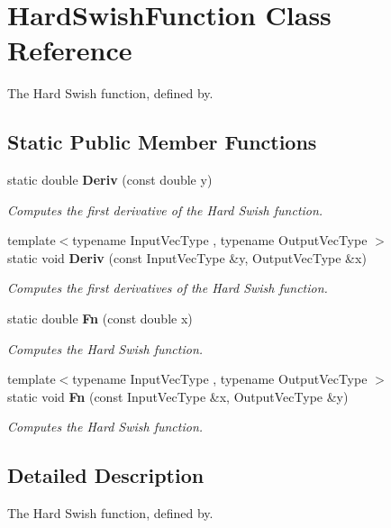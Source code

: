 \section{Hard\+Swish\+Function Class Reference}
\label{classmlpack_1_1ann_1_1HardSwishFunction}


The Hard Swish function, defined by.  


\subsection*{Static Public Member Functions}
\begin{DoxyCompactItemize}
\item 
static double \textbf{ Deriv} (const double y)
\begin{DoxyCompactList}\small\item\em Computes the first derivative of the Hard Swish function. \end{DoxyCompactList}\item 
{\footnotesize template$<$typename Input\+Vec\+Type , typename Output\+Vec\+Type $>$ }\\static void \textbf{ Deriv} (const Input\+Vec\+Type \&y, Output\+Vec\+Type \&x)
\begin{DoxyCompactList}\small\item\em Computes the first derivatives of the Hard Swish function. \end{DoxyCompactList}\item 
static double \textbf{ Fn} (const double x)
\begin{DoxyCompactList}\small\item\em Computes the Hard Swish function. \end{DoxyCompactList}\item 
{\footnotesize template$<$typename Input\+Vec\+Type , typename Output\+Vec\+Type $>$ }\\static void \textbf{ Fn} (const Input\+Vec\+Type \&x, Output\+Vec\+Type \&y)
\begin{DoxyCompactList}\small\item\em Computes the Hard Swish function. \end{DoxyCompactList}\end{DoxyCompactItemize}


\subsection{Detailed Description}
The Hard Swish function, defined by. 

